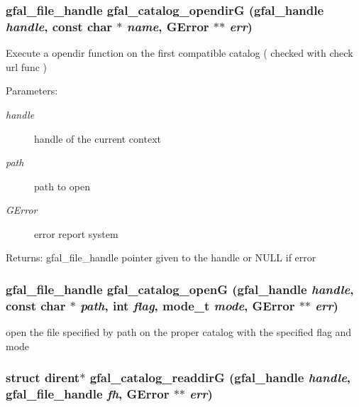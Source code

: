 \subsubsection{\setlength{\rightskip}{0pt plus 5cm}gfal\_\-file\_\-handle gfal\_\-catalog\_\-opendir\-G (gfal\_\-handle {\em handle}, const char $\ast$ {\em name}, GError $\ast$$\ast$ {\em err})}\label{gfal__common__catalog_8h_eb89b1d37a16ef8ecb50ac603366285c}


Execute a opendir function on the first compatible catalog ( checked with check url func ) \begin{Desc}
\item[Parameters:]
\begin{description}
\item[{\em handle}]handle of the current context \item[{\em path}]path to open \item[{\em GError}]error report system \end{description}
\end{Desc}
\begin{Desc}
\item[Returns:]gfal\_\-file\_\-handle pointer given to the handle or NULL if error \end{Desc}
\subsubsection{\setlength{\rightskip}{0pt plus 5cm}gfal\_\-file\_\-handle gfal\_\-catalog\_\-open\-G (gfal\_\-handle {\em handle}, const char $\ast$ {\em path}, int {\em flag}, mode\_\-t {\em mode}, GError $\ast$$\ast$ {\em err})}\label{gfal__common__catalog_8h_cd4cabbd5effdf20bc0b20345c5cc4ab}


open the file specified by path on the proper catalog with the specified flag and mode 
\subsubsection{\setlength{\rightskip}{0pt plus 5cm}struct dirent$\ast$ gfal\_\-catalog\_\-readdir\-G (gfal\_\-handle {\em handle}, gfal\_\-file\_\-handle {\em fh}, GError $\ast$$\ast$ {\em err})}\label{gfal__common__catalog_8h_9ba0d48d73fe53d42d3a715e57473adb}


